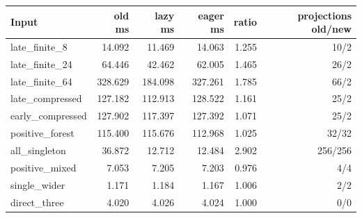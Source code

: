 \begin{center}\small
\begin{tabular}{@{}lrrrrr@{}}
\toprule
Input & old ms & lazy ms & eager ms & ratio & projections old/new \\
\midrule
late\_finite\_8 & 14.092 & 11.469 & 14.063 & 1.255 & 10/2 \\
late\_finite\_24 & 64.446 & 42.462 & 62.005 & 1.465 & 26/2 \\
late\_finite\_64 & 328.629 & 184.098 & 327.261 & 1.785 & 66/2 \\
late\_compressed & 127.182 & 112.913 & 128.522 & 1.161 & 25/2 \\
early\_compressed & 127.902 & 117.397 & 127.392 & 1.071 & 25/2 \\
positive\_forest & 115.400 & 115.676 & 112.968 & 1.025 & 32/32 \\
all\_singleton & 36.872 & 12.712 & 12.484 & 2.902 & 256/256 \\
positive\_mixed & 7.053 & 7.205 & 7.203 & 0.976 & 4/4 \\
single\_wider & 1.171 & 1.184 & 1.167 & 1.006 & 2/2 \\
direct\_three & 4.020 & 4.026 & 4.024 & 1.000 & 0/0 \\
\bottomrule
\end{tabular}
\end{center}
